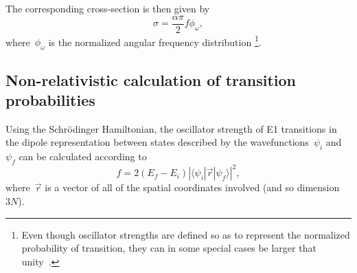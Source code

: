 The corresponding cross-section is then given by~\cite{EinsteinCoeff}
\begin{equation}
\sigma = \frac{\alpha \pi}{2} f \phi_{\omega},
\end{equation}
where~$\phi_{\omega}$ is the normalized angular frequency distribution \footnote{Even though oscillator strengths are defined so as to represent the normalized probability of transition, they can in some special cases be larger that unity~\cite{HENS2008391}.}.

\subsection{Non-relativistic calculation of transition probabilities}
	
	Using the Schr\"{o}dinger Hamiltonian, the oscillator strength of E1 transitions in the dipole representation between states described by the wavefunctions~$\psi_i$ and~$\psi_f$ can be calculated according to~\cite{demtroder2002laser}
\begin{equation}
    f = 2(E_f-E_i) \left|\langle \psi_i|\vec{r}|\psi_f \rangle \right|^2,
\end{equation}
where~$\vec{r}$ is a vector of all of the spatial coordinates involved (and so dimension~$3N$).

